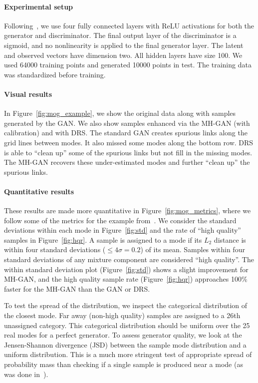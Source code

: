 \documentclass{article}
\renewcommand{\vec}[1]{{\boldsymbol{\mathbf{#1}}}} %
\newcommand{\R}{\mathbb{R}}
\begin{document}
\paragraph{Experimental setup}
Following~\citet{Azadi2018}, we use four fully connected layers with ReLU activations for both the generator and discriminator.
The final output layer of the discriminator is a sigmoid, and no nonlinearity is applied to the final generator layer.
The latent \smash{$\vec z \in \R^2$} and observed \smash{$\vec x \in \R^2$} vectors have dimension two.
All hidden layers have size 100.
We used \num{64000} training points and generated \num{10000} points in test.
The training data was standardized before training.

\paragraph{Visual results}
In Figure~\ref{fig:mog_example}, we show the original data along with samples generated by the GAN\@.
We also show samples enhanced via the MH-GAN (with calibration) and with DRS\@.
The standard GAN creates spurious links along the grid lines between modes.
It also missed some modes along the bottom row.
DRS is able to ``clean up'' some of the spurious links but not fill in the missing modes.
The MH-GAN recovers these under-estimated modes and further ``clean up'' the spurious links.

\paragraph{Quantitative results}
These results are made more quantitative in Figure~\ref{fig:mog_metrics}, where we follow some of the metrics for the example from~\citet{Azadi2018}.
We consider the standard deviations within each mode in Figure~\ref{fig:std} and the rate of ``high quality'' samples in Figure~\ref{fig:hqr}.
A sample is assigned to a mode if its $L_2$ distance is within four standard deviations ($\leq 4 \sigma = 0.2$) of its mean.
Samples within four standard deviations of any mixture component are considered ``high quality''.
The within standard deviation plot (Figure~\ref{fig:std}) shows a slight improvement for MH-GAN, and the high quality sample rate (Figure~\ref{fig:hqr}) approaches 100\% faster for the MH-GAN than the GAN or DRS\@.

To test the spread of the distribution, we inspect the categorical distribution of the closest mode.
Far away (non-high quality) samples are assigned to a 26th unassigned category.
This categorical distribution should be uniform over the 25 real modes for a perfect generator.
To assess generator quality, we look at the Jensen-Shannon divergence (JSD) between the sample mode distribution and a uniform distribution.
This is a much more stringent test of appropriate spread of probability mass than checking if a single sample is produced near a mode (as was done in~\citet{Azadi2018})\@.
\end{document}
